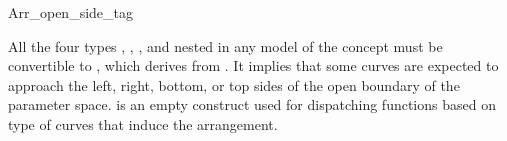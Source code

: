 
\ccRefPageBegin

\begin{ccRefClass}{Arr_open_side_tag}

\ccDefinition

All the four types ,
, ,
and  nested in any model of the
concept  must be convertible
to \ccRefName, which derives from . It
implies that some curves are expected to approach the left, right,
bottom, or top sides of the open boundary of the parameter
space. \ccRefName{} is an empty construct used for dispatching
functions based on type of curves that induce the arrangement.


\ccSeeAlso
    \\

\end{ccRefClass}

\ccRefPageEnd
